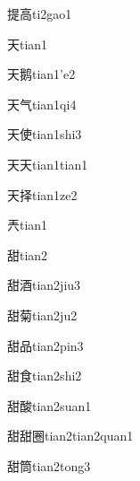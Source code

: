 \begin{verbete}[12;10]{提高}{ti2gao1}
\end{verbete}
\begin{verbete}[4]{天}{tian1}
\end{verbete}
\begin{verbete}[4;12]{天鹅}{tian1'e2}
\end{verbete}
\begin{verbete}[4;4]{天气}{tian1qi4}
\end{verbete}
\begin{verbete}[4;8]{天使}{tian1shi3}
\end{verbete}
\begin{verbete}[4;4]{天天}{tian1tian1}
\end{verbete}
\begin{verbete}[4;8]{天择}{tian1ze2}
\end{verbete}
\begin{verbete}[6]{兲}{tian1}
\end{verbete}
\begin{verbete}[11]{甜}{tian2}
\end{verbete}
\begin{verbete}[11;10]{甜酒}{tian2jiu3}
\end{verbete}
\begin{verbete}[11;11]{甜菊}{tian2ju2}
\end{verbete}
\begin{verbete}[11;9]{甜品}{tian2pin3}
\end{verbete}
\begin{verbete}[11;9]{甜食}{tian2shi2}
\end{verbete}
\begin{verbete}[11;14]{甜酸}{tian2suan1}
\end{verbete}
\begin{verbete}[11;11;11]{甜甜圈}{tian2tian2quan1}
\end{verbete}
\begin{verbete}[11;12]{甜筒}{tian2tong3}
\end{verbete}
